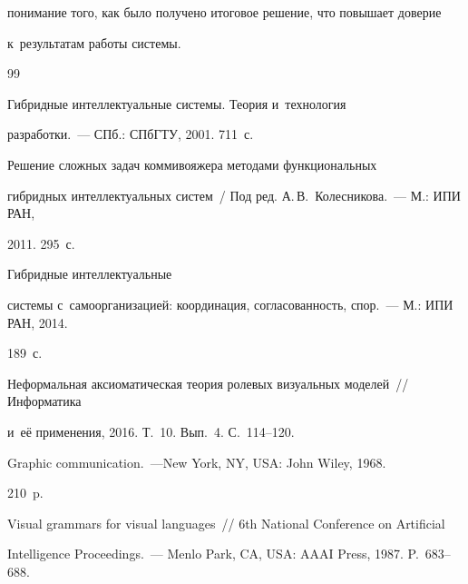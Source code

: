 понимание того, как было получено итоговое решение, что повышает доверие 


к~результатам работы системы. 


  


 {\small\frenchspacing


{%




\begin{thebibliography}{99}




   Гиб\-рид\-ные интеллектуальные сис\-те\-мы. Тео\-рия и~технология 


разработки.~--- СПб.: СПбГТУ, 2001. 711~с.




   Решение сложных задач коммивояжера методами функциональных 


гиб\-рид\-ных интеллектуальных сис\-тем~/ Под ред. А.\,В.~Колесникова.~--- М.: ИПИ РАН, 


2011. 295~с.




   Гиб\-рид\-ные интеллектуальные 


системы с~самоорганизацией: координация, согласованность, спор.~--- М.: ИПИ РАН, 2014. 


189~с.






Неформальная аксиоматическая тео\-рия ролевых визуальных моделей~/\!\!/ Информатика 


и~её применения, 2016. Т.~10. Вып.~4. С.~114--120.




   Graphic communication.~---New York, NY, USA: John Wiley, 1968. 


210~p. 




   Visual grammars for visual languages~/\!\!/ 6th National Conference on Artificial 


Intelligence Proceedings.~--- Menlo Park, CA, USA: AAAI Press, 1987. P.~683--688. 



\end{thebibliography}}}
